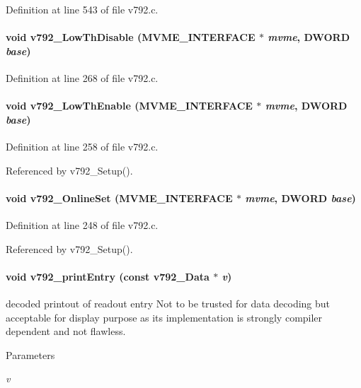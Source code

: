 Definition at line 543 of file v792.c.
\paragraph[{v792\_\-LowThDisable}]{\setlength{\rightskip}{0pt plus 5cm}void v792\_\-LowThDisable ({\bf MVME\_\-INTERFACE} $\ast$ {\em mvme}, \/  {\bf DWORD} {\em base})}\hfill\label{v792_8c_a69f05689b417afaa147650ccbd16c2cf}


Definition at line 268 of file v792.c.
\paragraph[{v792\_\-LowThEnable}]{\setlength{\rightskip}{0pt plus 5cm}void v792\_\-LowThEnable ({\bf MVME\_\-INTERFACE} $\ast$ {\em mvme}, \/  {\bf DWORD} {\em base})}\hfill\label{v792_8c_a18d55eb7a70830ed3486ca903cea172a}


Definition at line 258 of file v792.c.

Referenced by v792\_\-Setup().
\paragraph[{v792\_\-OnlineSet}]{\setlength{\rightskip}{0pt plus 5cm}void v792\_\-OnlineSet ({\bf MVME\_\-INTERFACE} $\ast$ {\em mvme}, \/  {\bf DWORD} {\em base})}\hfill\label{v792_8c_a2b31dff81eccb0fd5342891f39b6919a}


Definition at line 248 of file v792.c.

Referenced by v792\_\-Setup().
\paragraph[{v792\_\-printEntry}]{\setlength{\rightskip}{0pt plus 5cm}void v792\_\-printEntry (const {\bf v792\_\-Data} $\ast$ {\em v})}\hfill\label{v792_8c_a24de5c4823e19a5361b4fd5fe4f1f087}
decoded printout of readout entry Not to be trusted for data decoding but acceptable for display purpose as its implementation is strongly compiler dependent and not flawless. 
\begin{DoxyParams}{Parameters}
\item[{\em v}]\end{DoxyParams}


